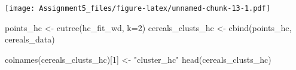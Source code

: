 \documentclass[
]{article}
\newenvironment{Shaded}{\begin{snugshade}}{\end{snugshade}}
\newcommand{\AttributeTok}[1]{\textcolor[rgb]{0.77,0.63,0.00}{#1}}
\newcommand{\DecValTok}[1]{\textcolor[rgb]{0.00,0.00,0.81}{#1}}
\newcommand{\FunctionTok}[1]{\textcolor[rgb]{0.00,0.00,0.00}{#1}}
\newcommand{\NormalTok}[1]{#1}
\newcommand{\OtherTok}[1]{\textcolor[rgb]{0.56,0.35,0.01}{#1}}
\newcommand{\StringTok}[1]{\textcolor[rgb]{0.31,0.60,0.02}{#1}}
\begin{document}
\texttt{[image: Assignment5\_files/figure-latex/unnamed-chunk-13-1.pdf]}

\begin{Shaded}
\begin{Highlighting}[]
\NormalTok{points\_hc }\OtherTok{\textless{}{-}} \FunctionTok{cutree}\NormalTok{(hc\_fit\_wd, }\AttributeTok{k=}\DecValTok{2}\NormalTok{)}
\NormalTok{cereals\_clusts\_hc }\OtherTok{\textless{}{-}} \FunctionTok{cbind}\NormalTok{(points\_hc, cereals\_data)}

\FunctionTok{colnames}\NormalTok{(cereals\_clusts\_hc)[}\DecValTok{1}\NormalTok{] }\OtherTok{\textless{}{-}} \StringTok{"cluster\_hc"}
\FunctionTok{head}\NormalTok{(cereals\_clusts\_hc)}
\end{Highlighting}
\end{Shaded}
\end{document}
